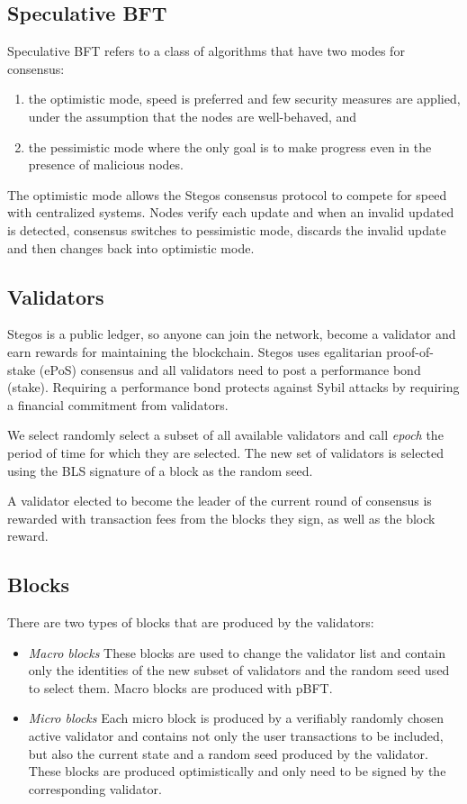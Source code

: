 \documentclass[8pt,fleqn,openany]{book}
\begin{document}
\subsection{Speculative BFT}
Speculative BFT refers to a class of algorithms that have two modes for consensus: 

\begin{enumerate}
	\item the optimistic mode, speed is preferred and few security measures are applied, under the assumption that the nodes are well-behaved, and
	\item the pessimistic mode where the only goal is to make progress even in the presence of malicious nodes.
\end{enumerate}

The optimistic mode allows the Stegos consensus protocol to compete for speed with centralized systems. Nodes verify each update and when an invalid updated is detected, consensus switches to pessimistic mode, discards the invalid update and then changes back into optimistic mode.

\subsection{Validators}
Stegos is a public ledger, so anyone can join the network, become a validator and earn rewards for maintaining the blockchain. Stegos uses egalitarian proof-of-stake (ePoS) consensus and all validators need to post a performance bond (stake). Requiring a performance bond protects against Sybil attacks by requiring a financial commitment from validators.

We select randomly select a subset of all available validators and call \textit{epoch} the period of time for which they are selected. The new set of validators is selected using the BLS signature of a block as the random seed.

A validator elected to become the leader of the current round of consensus is rewarded with transaction fees from the blocks they sign, as well as the block reward. 

\subsection{Blocks}
There are two types of blocks that are produced by the validators:

\begin{itemize}
	\item {\em Macro blocks} These blocks are used to change the validator list and contain only the identities of the new subset of validators and the random seed used to select them. Macro blocks are produced with pBFT.
	\item {\em Micro blocks} Each micro block is produced by a verifiably randomly chosen active validator and contains not only the user transactions to be included, but also the current state and a random seed produced by the validator. These blocks are produced optimistically and only need to be signed by the corresponding validator.
\end{itemize}
\end{document}
